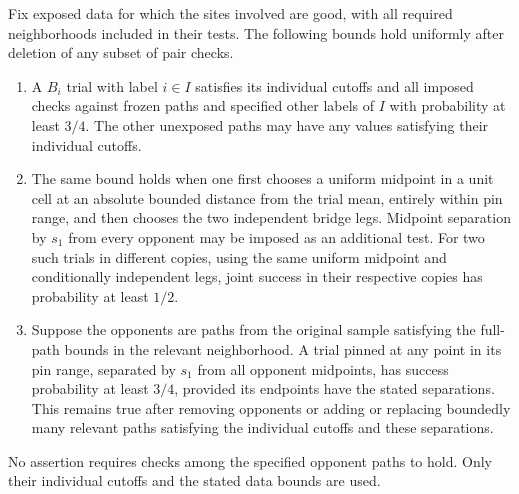 \begin{proposition}\label{prop:insertion}
Fix exposed data for which the sites involved are good, with all
required neighborhoods included in their tests.  The following bounds
hold uniformly after deletion of any subset of pair checks.
\begin{enumerate}
\item A $B_i$ trial with label $i\in I$ satisfies its individual
cutoffs and all imposed checks against frozen paths and specified
other labels of $I$ with probability at least $3/4$.  The other
unexposed paths may have any values satisfying their individual
cutoffs.
\item The same bound holds when one first chooses a uniform midpoint
in a unit cell at an absolute bounded distance from the trial mean,
entirely within pin range, and then chooses the two independent
bridge legs.  Midpoint separation by $s_1$ from every opponent may
be imposed as an additional test.  For two such trials in different
copies, using the same uniform midpoint and conditionally independent
legs, joint success in their respective copies has probability at
least $1/2$.
\item Suppose the opponents are paths from the original sample
satisfying the full-path bounds in the relevant neighborhood.  A
trial pinned at any point in its pin range, separated by $s_1$ from
all opponent midpoints, has success probability at least $3/4$,
provided its endpoints have the stated separations.  This remains
true after removing opponents or adding or replacing boundedly many
relevant paths satisfying the individual cutoffs and these
separations.
\end{enumerate}
No assertion requires checks among the specified opponent paths to
hold.  Only their individual cutoffs and the stated data bounds are
used.
\end{proposition}

